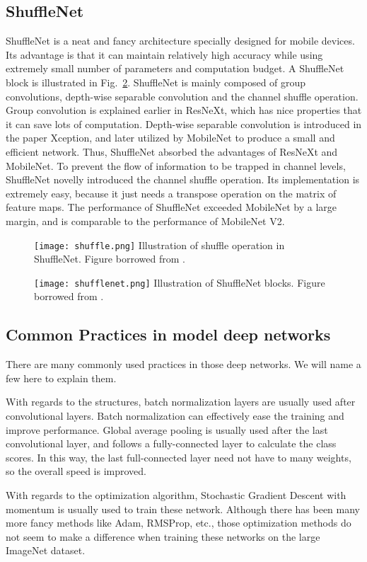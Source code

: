 \subsection{ShuffleNet}
ShuffleNet is a neat and fancy architecture specially designed for mobile devices. Its advantage is that it can maintain relatively high accuracy while using extremely small number of parameters and computation budget. A ShuffleNet block is illustrated in Fig.~\ref{fig:shufflenet}. ShuffleNet is mainly composed of group convolutions, depth-wise separable convolution and the channel shuffle operation. Group convolution is explained earlier in ResNeXt, which has nice properties that it can save lots of computation. Depth-wise separable convolution is introduced in the paper Xception, and later utilized by MobileNet\cite{howard2017mobilenets} to produce a small and efficient network. Thus, ShuffleNet absorbed the advantages of ResNeXt and MobileNet. To prevent the flow of information to be trapped in channel levels, ShuffleNet novelly introduced the channel shuffle operation. Its implementation is extremely easy, because it just needs a transpose operation on the matrix of feature maps. The performance of ShuffleNet exceeded MobileNet by a large margin, and is comparable to the performance of MobileNet V2.
\begin{figure}[!htp]
	\centering
	\texttt{[image: shuffle.png]}
	{Illustration of shuffle operation in ShuffleNet. Figure borrowed from \parencite{zhang2017shufflenet}.}
	\label{fig:shuffle}
\end{figure}
\begin{figure}[!htp]
	\centering
	\texttt{[image: shufflenet.png]}
	{Illustration of ShuffleNet blocks. Figure borrowed from \parencite{zhang2017shufflenet}.}
	\label{fig:shufflenet}
\end{figure}

\subsection{Common Practices in model deep networks}

There are many commonly used practices in those deep networks. We will name a few here to explain them.

With regards to the structures, batch normalization layers are usually used after convolutional layers. Batch normalization can effectively ease the training and improve performance. Global average pooling is usually used after the last convolutional layer, and follows a fully-connected layer to calculate the class scores. In this way, the last full-connected layer need not have to many weights, so the overall speed is improved.

With regards to the optimization algorithm, Stochastic Gradient Descent with momentum is usually used to train these network. Although there has been many more fancy methods like Adam, RMSProp, etc., those optimization methods do not seem to make a difference when training these networks on the large ImageNet dataset.